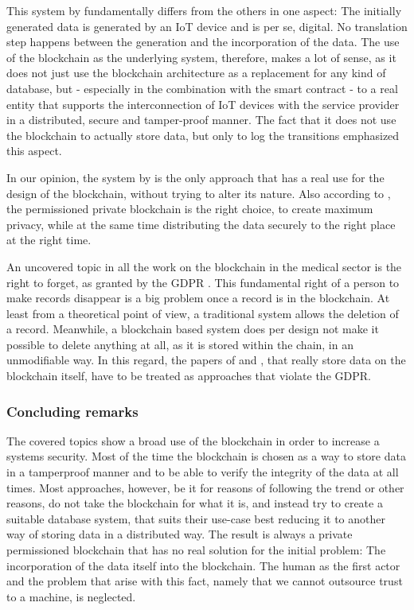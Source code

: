 This system by \cite{Baccarini2018} fundamentally differs from the others in one aspect: The initially generated data is generated by an IoT device and is per se, digital. No translation step happens between the generation and the incorporation of the data.
The use of the blockchain as the underlying system, therefore, makes a lot of sense, as it does not just use the blockchain architecture as a replacement for any kind of database, but - especially in the combination with the smart contract - to a real entity that supports the interconnection of IoT devices with the service provider in a distributed, secure and tamper-proof manner. The fact that it does not use the blockchain to actually store data, but only to log the transitions emphasized this aspect.

In our opinion, the system by \citeauthor{Baccarini2018} is the only approach that has a real use for the design of the blockchain, without trying to alter its nature. Also according to \citeauthor{Wust2017}, the permissioned private blockchain is the right choice, to create maximum privacy, while at the same time distributing the data securely to the right place at the right time.

An uncovered topic in all the work on the blockchain in the medical sector is the right to forget, as granted by the GDPR \cite{EuropeanCommission2017}. This fundamental right of a person to make records disappear is a big problem once a record is in the blockchain. At least from a theoretical point of view, a traditional system allows the deletion of a record. Meanwhile, a blockchain based system does per design not make it possible to delete anything at all, as it is stored within the chain, in an unmodifiable way. In this regard, the papers of \cite{Cao2019} and \cite{Azaria2016}, that really store data on the blockchain itself, have to be treated as approaches that violate the GDPR.

\subsubsection{Concluding remarks}
The covered topics show a broad use of the blockchain in order to increase a systems security. Most of the time the blockchain is chosen as a way to store data in a tamperproof manner and to be able to verify the integrity of the data at all times.
Most approaches, however, be it for reasons of following the trend or other reasons, do not take the blockchain for what it is, and instead try to create a suitable database system, that suits their use-case best reducing it to another way of storing data in a distributed way. The result is always a private permissioned blockchain that has no real solution for the initial problem: The incorporation of the data itself into the blockchain. The human as the first actor and the problem that arise with this fact, namely that we cannot outsource trust to a machine, is neglected.

